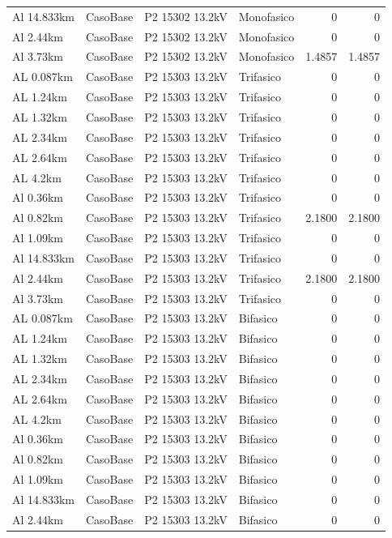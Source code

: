 \documentclass[11pt,a4paper]{article}
\begin{document}
\begin{longtable}{llllrr}
Al 14.833km & CasoBase & P2 15302 13.2kV & Monofasico & 0 & 0 \\
Al 2.44km & CasoBase & P2 15302 13.2kV & Monofasico & 0 & 0 \\
Al 3.73km & CasoBase & P2 15302 13.2kV & Monofasico & 1.4857 & 1.4857 \\
AL 0.087km & CasoBase & P2 15303 13.2kV & Trifasico & 0 & 0 \\
AL 1.24km & CasoBase & P2 15303 13.2kV & Trifasico & 0 & 0 \\
AL 1.32km & CasoBase & P2 15303 13.2kV & Trifasico & 0 & 0 \\
AL 2.34km & CasoBase & P2 15303 13.2kV & Trifasico & 0 & 0 \\
AL 2.64km & CasoBase & P2 15303 13.2kV & Trifasico & 0 & 0 \\
AL 4.2km & CasoBase & P2 15303 13.2kV & Trifasico & 0 & 0 \\
Al 0.36km & CasoBase & P2 15303 13.2kV & Trifasico & 0 & 0 \\
Al 0.82km & CasoBase & P2 15303 13.2kV & Trifasico & 2.1800 & 2.1800 \\
Al 1.09km & CasoBase & P2 15303 13.2kV & Trifasico & 0 & 0 \\
Al 14.833km & CasoBase & P2 15303 13.2kV & Trifasico & 0 & 0 \\
Al 2.44km & CasoBase & P2 15303 13.2kV & Trifasico & 2.1800 & 2.1800 \\
Al 3.73km & CasoBase & P2 15303 13.2kV & Trifasico & 0 & 0 \\
AL 0.087km & CasoBase & P2 15303 13.2kV & Bifasico & 0 & 0 \\
AL 1.24km & CasoBase & P2 15303 13.2kV & Bifasico & 0 & 0 \\
AL 1.32km & CasoBase & P2 15303 13.2kV & Bifasico & 0 & 0 \\
AL 2.34km & CasoBase & P2 15303 13.2kV & Bifasico & 0 & 0 \\
AL 2.64km & CasoBase & P2 15303 13.2kV & Bifasico & 0 & 0 \\
AL 4.2km & CasoBase & P2 15303 13.2kV & Bifasico & 0 & 0 \\
Al 0.36km & CasoBase & P2 15303 13.2kV & Bifasico & 0 & 0 \\
Al 0.82km & CasoBase & P2 15303 13.2kV & Bifasico & 0 & 0 \\
Al 1.09km & CasoBase & P2 15303 13.2kV & Bifasico & 0 & 0 \\
Al 14.833km & CasoBase & P2 15303 13.2kV & Bifasico & 0 & 0 \\
Al 2.44km & CasoBase & P2 15303 13.2kV & Bifasico & 0 & 0 \\

\end{longtable}
\end{document}

